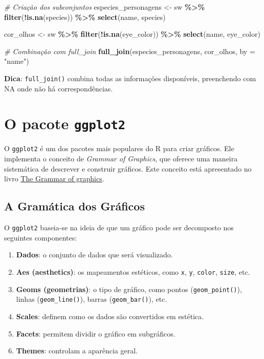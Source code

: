 \documentclass[
]{book}
\newenvironment{Shaded}{\begin{snugshade}}{\end{snugshade}}
\newcommand{\AttributeTok}[1]{\textcolor[rgb]{0.13,0.29,0.53}{#1}}
\newcommand{\CommentTok}[1]{\textcolor[rgb]{0.56,0.35,0.01}{\textit{#1}}}
\newcommand{\FunctionTok}[1]{\textcolor[rgb]{0.13,0.29,0.53}{\textbf{#1}}}
\newcommand{\NormalTok}[1]{#1}
\newcommand{\OtherTok}[1]{\textcolor[rgb]{0.56,0.35,0.01}{#1}}
\newcommand{\SpecialCharTok}[1]{\textcolor[rgb]{0.81,0.36,0.00}{\textbf{#1}}}
\newcommand{\StringTok}[1]{\textcolor[rgb]{0.31,0.60,0.02}{#1}}
\begin{document}
\begin{Shaded}
\begin{Highlighting}[]
\CommentTok{\# Criação dos subconjuntos}
\NormalTok{especies\_personagens }\OtherTok{\textless{}{-}}\NormalTok{ sw }\SpecialCharTok{\%\textgreater{}\%} 
  \FunctionTok{filter}\NormalTok{(}\SpecialCharTok{!}\FunctionTok{is.na}\NormalTok{(species)) }\SpecialCharTok{\%\textgreater{}\%} 
  \FunctionTok{select}\NormalTok{(name, species)}

\NormalTok{cor\_olhos }\OtherTok{\textless{}{-}}\NormalTok{ sw }\SpecialCharTok{\%\textgreater{}\%} 
  \FunctionTok{filter}\NormalTok{(}\SpecialCharTok{!}\FunctionTok{is.na}\NormalTok{(eye\_color)) }\SpecialCharTok{\%\textgreater{}\%} 
  \FunctionTok{select}\NormalTok{(name, eye\_color)}

\CommentTok{\# Combinação com full\_join}
\FunctionTok{full\_join}\NormalTok{(especies\_personagens, cor\_olhos, }\AttributeTok{by =} \StringTok{"name"}\NormalTok{)}
\end{Highlighting}
\end{Shaded}

\textbf{Dica}: \texttt{full\_join()} combina todas as informações disponíveis,
preenchendo com NA onde não há correspondências.

\chapter{\texorpdfstring{O pacote \texttt{ggplot2}}{O pacote ggplot2}}\label{o-pacote-ggplot2}

O \texttt{ggplot2} é um dos pacotes mais populares do R para criar gráficos.
Ele implementa o conceito de \emph{Grammar of Graphics}, que oferece uma
maneira sistemática de descrever e construir gráficos. Este conceito
está apresentado no livro \href{https://link.springer.com/book/10.1007/0-387-28695-0}{The Grammar of
graphics}.

\section{A Gramática dos Gráficos}\label{a-gramuxe1tica-dos-gruxe1ficos}

O \texttt{ggplot2} baseia-se na ideia de que um gráfico pode ser decomposto nos seguintes componentes:

\begin{enumerate}
\def\labelenumi{\arabic{enumi}.}
\item
  \textbf{Dados}: o conjunto de dados que será visualizado.
\item
  \textbf{Aes (aesthetics)}: os mapeamentos estéticos, como \texttt{x}, \texttt{y}, \texttt{color}, \texttt{size}, etc.
\item
  \textbf{Geoms (geometrias)}: o tipo de gráfico, como pontos (\texttt{geom\_point()}), linhas (\texttt{geom\_line()}), barras (\texttt{geom\_bar()}), etc.
\item
  \textbf{Scales}: definem como os dados são convertidos em estética.
\item
  \textbf{Facets}: permitem dividir o gráfico em subgráficos.
\item
  \textbf{Themes}: controlam a aparência geral.
\end{enumerate}
\end{document}
